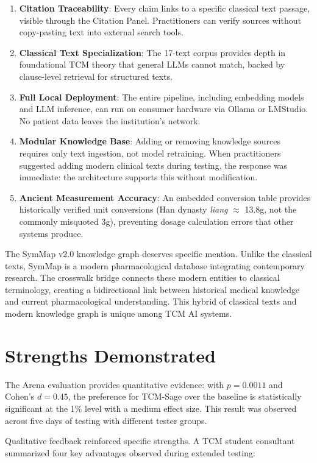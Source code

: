 \begin{enumerate}
    \item \textbf{Citation Traceability}: Every claim links to a specific classical text passage, visible through the Citation Panel. Practitioners can verify sources without copy-pasting text into external search tools.
    \item \textbf{Classical Text Specialization}: The 17-text corpus provides depth in foundational TCM theory that general LLMs cannot match, backed by clause-level retrieval for structured texts.
    \item \textbf{Full Local Deployment}: The entire pipeline, including embedding models and LLM inference, can run on consumer hardware via Ollama or LMStudio. No patient data leaves the institution's network.
    \item \textbf{Modular Knowledge Base}: Adding or removing knowledge sources requires only text ingestion, not model retraining. When practitioners suggested adding modern clinical texts during testing, the response was immediate: the architecture supports this without modification.
    \item \textbf{Ancient Measurement Accuracy}: An embedded conversion table provides historically verified unit conversions (Han dynasty \textit{liang} $\approx$ 13.8g, not the commonly misquoted 3g), preventing dosage calculation errors that other systems produce.
\end{enumerate}

The SymMap v2.0 knowledge graph deserves specific mention. Unlike the classical texts, SymMap is a modern pharmacological database integrating contemporary research. The crosswalk bridge connects these modern entities to classical terminology, creating a bidirectional link between historical medical knowledge and current pharmacological understanding. This hybrid of classical texts and modern knowledge graph is unique among TCM AI systems.

\section{Strengths Demonstrated}

The Arena evaluation provides quantitative evidence: with $p = 0.0011$ and Cohen's $d = 0.45$, the preference for TCM-Sage over the baseline is statistically significant at the 1\% level with a medium effect size. This result was observed across five days of testing with different tester groups.

Qualitative feedback reinforced specific strengths. A TCM student consultant summarized four key advantages observed during extended testing:

